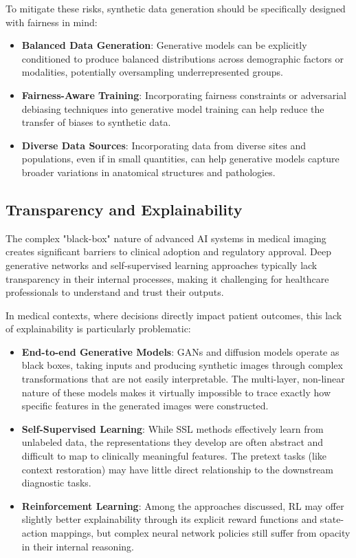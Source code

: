 \documentclass{article}
\begin{document}
To mitigate these risks, synthetic data generation should be specifically designed with fairness in mind:

\begin{itemize}
    \item \textbf{Balanced Data Generation}: Generative models can be explicitly conditioned to produce balanced distributions across demographic factors or modalities, potentially oversampling underrepresented groups.
    
    \item \textbf{Fairness-Aware Training}: Incorporating fairness constraints or adversarial debiasing techniques into generative model training can help reduce the transfer of biases to synthetic data.
    
    \item \textbf{Diverse Data Sources}: Incorporating data from diverse sites and populations, even if in small quantities, can help generative models capture broader variations in anatomical structures and pathologies.
\end{itemize}


\subsection{Transparency and Explainability}
The complex "black-box" nature of advanced AI systems in medical imaging creates significant barriers to clinical adoption and regulatory approval. Deep generative networks and self-supervised learning approaches typically lack transparency in their internal processes, making it challenging for healthcare professionals to understand and trust their outputs\cite{vermaRoleDeepLearning2023}.

In medical contexts, where decisions directly impact patient outcomes, this lack of explainability is particularly problematic:

\begin{itemize}
    \item \textbf{End-to-end Generative Models}: GANs and diffusion models operate as black boxes, taking inputs and producing synthetic images through complex transformations that are not easily interpretable. The multi-layer, non-linear nature of these models makes it virtually impossible to trace exactly how specific features in the generated images were constructed.
    
    \item \textbf{Self-Supervised Learning}: While SSL methods effectively learn from unlabeled data, the representations they develop are often abstract and difficult to map to clinically meaningful features. The pretext tasks (like context restoration) may have little direct relationship to the downstream diagnostic tasks.
    
    \item \textbf{Reinforcement Learning}: Among the approaches discussed, RL may offer slightly better explainability through its explicit reward functions and state-action mappings, but complex neural network policies still suffer from opacity in their internal reasoning.
\end{itemize}
\end{document}
